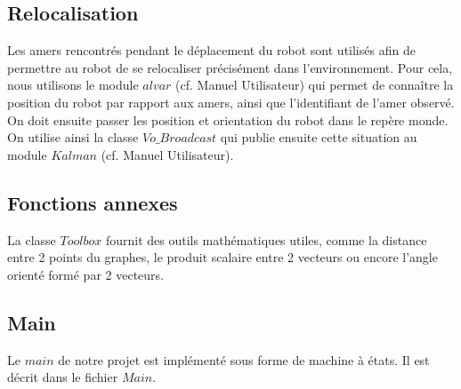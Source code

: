 \documentclass[10pt,a4paper]{article}
\begin{document}
\subsection{Relocalisation}
\label{sec:relocalisation}

Les amers rencontrés pendant le déplacement du robot sont utilisés afin de permettre au robot de se relocaliser précisément dans l'environnement. Pour cela, nous utilisons le module $alvar$ (cf. Manuel Utilisateur) qui permet de connaître la position du robot par rapport aux amers, ainsi que l'identifiant de l'amer observé. On doit ensuite passer les position et orientation du robot dans le repère monde. On utilise ainsi la classe $Vo\_Broadcast$ qui publie ensuite cette situation au module $Kalman$ (cf. Manuel Utilisateur).


\subsection{Fonctions annexes}
\label{sec:fonctions_annexes}

La classe $Toolbox$ fournit des outils mathématiques utiles, comme la distance entre 2 points du graphes, le produit scalaire entre 2 vecteurs ou encore l'angle orienté formé par 2 vecteurs.


\subsection{Main}
\label{sec:main}

Le $main$ de notre projet est implémenté sous forme de machine à états. Il est décrit dans le fichier $Main$.
\end{document}
